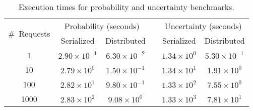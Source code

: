 \begin{table}[ht]
  \centering
  \caption{Execution times for probability and uncertainty benchmarks.}
  \label{tab:benchmark-times}
  \begin{tabular}{@{}cccccc@{}}
    \toprule
    \multirow{2}{*}{\#~Requests} &
      \multicolumn{2}{c}{Probability (seconds)} &
      \phantom{ab} &
      \multicolumn{2}{c}{Uncertainty (seconds)} \\
    \cmidrule{2-3} \cmidrule{5-6}
     & Serialized & Distributed & & Serialized & Distributed \\
    \midrule
      1    & \(2.90\times10^{-1}\) & \(6.30\times10^{-2}\) & & \(1.34\times10^{0}\) & \(5.30\times10^{-1}\) \\
      10   & \(2.79\times10^{0}\)  & \(1.50\times10^{-1}\) & & \(1.34\times10^{1}\) & \(1.91\times10^{0}\)  \\
      100  & \(2.82\times10^{1}\)  & \(9.80\times10^{-1}\) & & \(1.33\times10^{2}\) & \(7.55\times10^{0}\)  \\
      1000 & \(2.83\times10^{2}\)  & \(9.08\times10^{0}\)  & & \(1.33\times10^{3}\) & \(7.81\times10^{1}\)  \\
    \bottomrule
  \end{tabular}
\end{table}